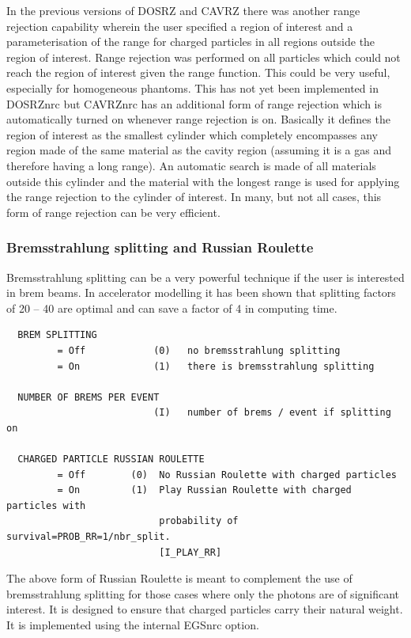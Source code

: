 \documentclass[12pt,twoside]{article}  %
\begin{document}
In the previous versions of DOSRZ and CAVRZ there was another range
rejection capability wherein the user specified a region of interest and a
parameterisation of the range for charged particles in all regions outside
the region of interest. Range rejection was performed on all particles
which could not reach the region of interest given the range function. This
could be very useful, especially for homogeneous phantoms.  This has not
yet been implemented in DOSRZnrc but CAVRZnrc has an additional form of
range rejection which is automatically turned on whenever range rejection
is on.  Basically it defines the region of interest as the smallest
cylinder which completely encompasses any region made of the same material
as the cavity region (assuming it is a gas and therefore having a long
range).  An automatic search is made of all materials outside this cylinder
and the material with the longest range is used for applying the range
rejection to the cylinder of interest.  In many, but not all cases, this
form of range rejection can be very efficient.

\subsubsection[Brem splitting and Russian Roulette]{Bremsstrahlung
splitting and Russian Roulette}

Bremsstrahlung splitting can be a very powerful technique if the user is
interested in brem beams. In accelerator modelling it has been
shown that splitting factors of 20 -- 40 are optimal\cite{Ro98a} and can
save a factor of 4 in computing time.

\begin{verbatim}
  BREM SPLITTING
         = Off            (0)   no bremsstrahlung splitting
         = On             (1)   there is bremsstrahlung splitting

  NUMBER OF BREMS PER EVENT
                          (I)   number of brems / event if splitting on

  CHARGED PARTICLE RUSSIAN ROULETTE
         = Off        (0)  No Russian Roulette with charged particles
         = On         (1)  Play Russian Roulette with charged particles with
                           probability of survival=PROB_RR=1/nbr_split.
                           [I_PLAY_RR]
\end{verbatim}
The above form of Russian Roulette is meant to complement the use of
bremsstrahlung splitting for those cases where only the photons are of
significant interest. It is designed to ensure that charged particles carry
their natural weight. It is implemented using the internal EGSnrc option.
\end{document}
